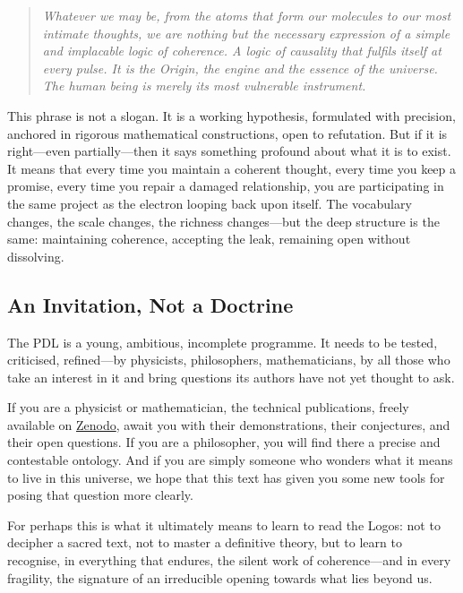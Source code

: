\documentclass[12pt, a4paper, openright]{book}
\begin{document}
\begin{quote}
\itshape Whatever we may be, from the atoms that form our molecules to our most intimate thoughts, we are nothing but the necessary expression of a simple and implacable logic of coherence. A logic of causality that fulfils itself at every pulse. It is the Origin, the engine and the essence of the universe. The human being is merely its most vulnerable instrument.
\end{quote}

This phrase is not a slogan. It is a working hypothesis, formulated with precision, anchored in rigorous mathematical constructions, open to refutation. But if it is right---even partially---then it says something profound about what it is to exist. It means that every time you maintain a coherent thought, every time you keep a promise, every time you repair a damaged relationship, you are participating in the same project as the electron looping back upon itself. The vocabulary changes, the scale changes, the richness changes---but the deep structure is the same: maintaining coherence, accepting the leak, remaining open without dissolving.

\subsection*{An Invitation, Not a Doctrine}

The PDL is a young, ambitious, incomplete programme. It needs to be tested, criticised, refined---by physicists, philosophers, mathematicians, by all those who take an interest in it and bring questions its authors have not yet thought to ask.

\medskip

If you are a physicist or mathematician, the technical publications, freely available on \href{https://zenodo.org}{Zenodo}, await you with their demonstrations, their conjectures, and their open questions. If you are a philosopher, you will find there a precise and contestable ontology. And if you are simply someone who wonders what it means to live in this universe, we hope that this text has given you some new tools for posing that question more clearly.

\medskip

For perhaps this is what it ultimately means to learn to read the Logos: not to decipher a sacred text, not to master a definitive theory, but to learn to recognise, in everything that endures, the silent work of coherence---and in every fragility, the signature of an irreducible opening towards what lies beyond us.
\end{document}
